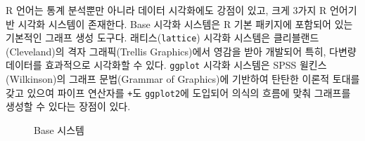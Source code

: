\documentclass[
  letterpaper,
]{book}
\begin{document}
R 언어는 통계 분석뿐만 아니라 데이터 시각화에도 강점이 있고, 크게 3가지
R 언어기반 시각화 시스템이 존재한다. Base 시각화 시스템은 R 기본
패키지에 포함되어 있는 기본적인 그래프 생성 도구다.
래티스(\texttt{lattice}) 시각화 시스템은 클리블랜드(Cleveland)의 격자
그래픽(Trellis Graphics)에서 영감을 받아 개발되어 특히, 다변량 데이터를
효과적으로 시각화할 수 있다. \texttt{ggplot} 시각화 시스템은 SPSS
윌킨스(Wilkinson)의 그래프 문법(Grammar of Graphics)에 기반하여 탄탄한
이론적 토대를 갖고 있으여 파이프 연산자를 \texttt{+}도
\texttt{ggplot2}에 도입되어 의식의 흐름에 맞춰 그래프를 생성할 수 있다는
장점이 있다.

\begin{figure}

\begin{minipage}[t]{0.33\linewidth}

{\centering 


\caption{Base 시스템}

}

\end{minipage}%
%
\begin{minipage}[t]{0.33\linewidth}

{\centering 

\raisebox{-\height}{

}}
\end{minipage}
\end{figure}
\end{document}
